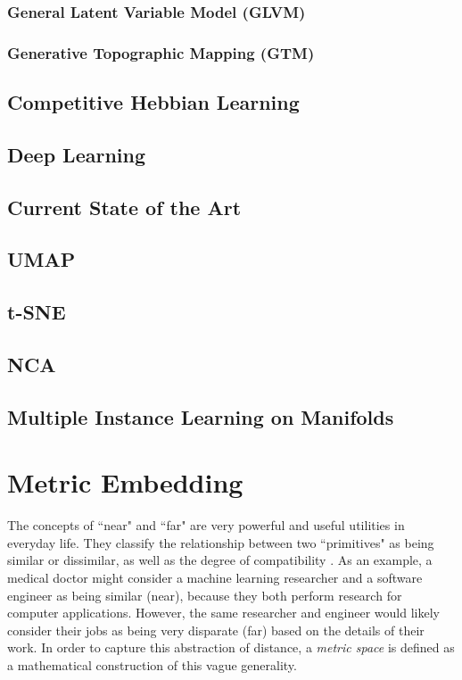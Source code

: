 \subsubsection{General Latent Variable Model (GLVM)}

\subsubsection{Generative Topographic Mapping (GTM)}

\subsection{Competitive Hebbian Learning}

\subsection{Deep Learning}

\subsection{Current State of the Art}
\subsection{UMAP}

\subsection{t-SNE}

\subsection{NCA}

\subsection{Multiple Instance Learning on Manifolds}

\section{Metric Embedding}

The concepts of ``near" and ``far" are very powerful and useful utilities in everyday life.  They classify the relationship between two ``primitives" as being similar or dissimilar, as well as the degree of compatibility \cite{Thorstensen2009ManifoldThesis}. As an example, a medical doctor might consider a machine learning researcher and a software engineer as being similar (near), because they both perform research for computer applications.  However, the same researcher and engineer would likely consider their jobs as being very disparate (far) based on the details of their work.  In order to capture this abstraction of distance, a \textit{metric space} is defined as a mathematical construction  of this vague generality.

